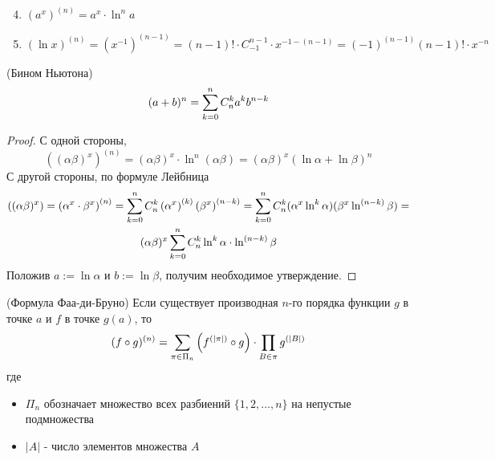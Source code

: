 \begin{enumerate}
\setcounter{enumi}{3}
	\item $(a^x)^{(n)} = a^x \cdot \ln^n a$
	\item $(\ln x)^{(n)} = (x^{-1})^{(n - 1)} = (n - 1)! \cdot C_{-1}^{n - 1} \cdot x^{-1 - (n - 1)} = (-1)^{(n - 1)} (n - 1)! \cdot x^{-n}$
\end{enumerate}

\begin{corollary} (Бином Ньютона)
	\[
	(a + b)^n = \sum\limits_{k = 0}^n C_n^k a^k b^{n - k}
	\]
\end{corollary}

\begin{proof}
	С одной стороны,
	\[
	\left((\alpha\beta)^x\right)^{(n)} = (\alpha\beta)^x \cdot \ln^n (\alpha\beta) = (\alpha\beta)^x(\ln \alpha + \ln \beta)^n
	\]
	С другой стороны, по формуле Лейбница
	\begin{multline*}
	\left((\alpha\beta)^x\right) = \left(\alpha^x \cdot \beta^x\right)^{(n)} = \sum\limits_{k = 0}^n C_n^k \left(\alpha^x\right)^{(k)}\left(\beta^x\right)^{(n - k)} = \sum\limits_{k = 0}^n C_n^k (\alpha^x \ln^k \alpha)(\beta^x \ln^{(n - k)} \beta) = \\
	(\alpha\beta)^x \sum\limits_{k = 0}^n C_n^k \ln^k \alpha \cdot \ln^{(n - k)} \beta
	\end{multline*}
	Положив $a := \ln \alpha$ и $b := \ln \beta$, получим необходимое утверждение.
\end{proof}

\begin{theorem} (Формула Фаа-ди-Бруно)
	Если существует производная $n$-го порядка функции $g$ в точке $a$ и $f$ в точке $g(a)$, то
	\[
		(f \circ g)^{(n)} = \sum\limits_{\pi \in \Pi_n} \left(f^{(|\pi|)} \circ g\right) \cdot \prod\limits_{B \in \pi} g^{(|B|)}
	\]
	где 
	\begin{itemize}
		\item $\Pi_n$ обозначает множество всех разбиений $\{1, 2, \dots, n\}$ на непустые подмножества
		\item $|A|$ - число элементов множества $A$
	\end{itemize}
\end{theorem}

